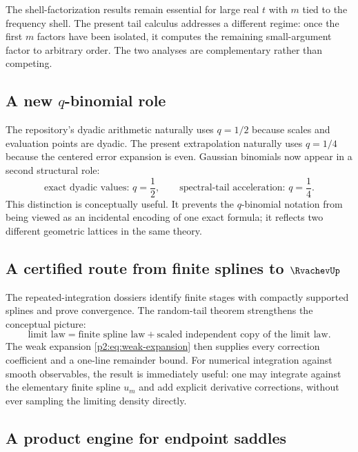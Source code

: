 \documentclass[11pt,oneside]{article}
\numberwithin{equation}{section}
\theoremstyle{definition}
\theoremstyle{remark}
\begin{document}
The shell-factorization results remain essential for large real $t$ with $m$ tied to the
frequency shell.  The present tail calculus addresses a different regime: once the first
$m$ factors have been isolated, it computes the remaining small-argument factor to arbitrary
order.  The two analyses are complementary rather than competing.

\subsection{A new $q$-binomial role}

The repository's dyadic arithmetic naturally uses $q=1/2$ because scales and evaluation
points are dyadic.  The present extrapolation naturally uses $q=1/4$ because the centered
error expansion is even.  Gaussian binomials now appear in a second structural role:
\begin{equation}
 \text{exact dyadic values: }q=\frac12,
 \qquad
 \text{spectral-tail acceleration: }q=\frac14.
 \label{p2:eq:two-q}
\end{equation}
This distinction is conceptually useful.  It prevents the $q$-binomial notation from being
viewed as an incidental encoding of one exact formula; it reflects two different geometric
lattices in the same theory.

\subsection{A certified route from finite splines to $\RvachevUp$}

The repeated-integration dossiers identify finite stages with compactly supported splines and
prove convergence.  The random-tail theorem strengthens the conceptual picture:
\[
 \text{limit law} = \text{finite spline law} + \text{scaled independent copy of the limit law}.
\]
The weak expansion \eqref{p2:eq:weak-expansion} then supplies every correction coefficient and a
one-line remainder bound.  For numerical integration against smooth observables, the result
is immediately useful: one may integrate against the elementary finite spline $u_m$ and add
explicit derivative corrections, without ever sampling the limiting density directly.

\subsection{A product engine for endpoint saddles}
\end{document}
